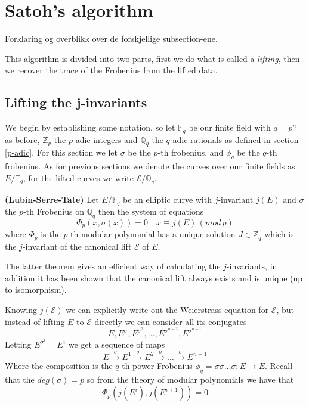 \section{Satoh's algorithm} \label{satoh}
Forklaring og overblikk over de forskjellige subsection-ene.

This algorithm is divided into two parts, first we do what is called a \emph{lifting}, then
we recover the trace of the Frobenius from the lifted data.

\subsection{Lifting the j-invariants}
We begin by establishing some notation, so let $\mathbb{F}_q$ be our finite field with $q=p^n$ as before,
$\mathbb{Z}_p$ the $p$-adic integers and $\mathbb{Q}_q$ the $q$-adic rationals as defined in section \ref{p-adic}.
For this section we let $\sigma$ be the $p$-th frobenius, and $\phi_q$ be the $q$-th frobenius.
As for previous sections we denote the curves over our finite fields as $E/\mathbb{F}_q$,
for the lifted curves we write $\mathscr{E}/\mathbb{Q}_q$.

\begin{thm}
 \textbf{(Lubin-Serre-Tate)} Let $E/\mathbb{F}_q$ be an elliptic curve with $j$-invariant $j(E)$ and
$\sigma$ the $p$-th Frobenius on $\mathbb{Q}_q$ then the system of equations
$$ \Phi_p(x, \sigma(x)) = 0 \quad x \equiv j(E) \, (mod\, p)$$
where $\Phi_p$ is the $p$-th modular polynomial has a unique solution $J \in \mathbb{Z}_q$ 
which is the $j$-invariant of the canonical lift $\mathscr{E}$ of $E$.
\end{thm}
The latter theorem gives an efficient way of calculating the $j$-invariants, in addition it has
been shown \cite{Deuring} that the canonical lift always exists and is unique (up to isomorphism).

Knowing $j(\mathscr{E})$ we can explicitly write out the Weierstrass equation for $\mathscr{E}$, but
instead of lifting $E$ to $\mathscr{E}$ directly we can consider all its conjugates
$$E, E^\sigma, E^{\sigma^2}, \ldots, E^{\sigma^{n-2}}, E^{\sigma^{n-1}} $$
Letting $E^{\sigma^i} = E^i $ we get a sequence of maps
$$ E \overset{\sigma}{\rightarrow} E^1 \overset{\sigma}{\rightarrow} E^2 \overset{\sigma}{\rightarrow}
\ldots \overset{\sigma}{\rightarrow} E^{n-1} $$
Where the composition is the $q$-th power Frobenius $\phi_q = \sigma \sigma \ldots \sigma: E \rightarrow E$.
Recall that the $deg(\sigma) = p$ so from the theory of modular polynomials we have that
$$ \Phi_p(j(E^i), j(E^{i+1})) = 0 $$

